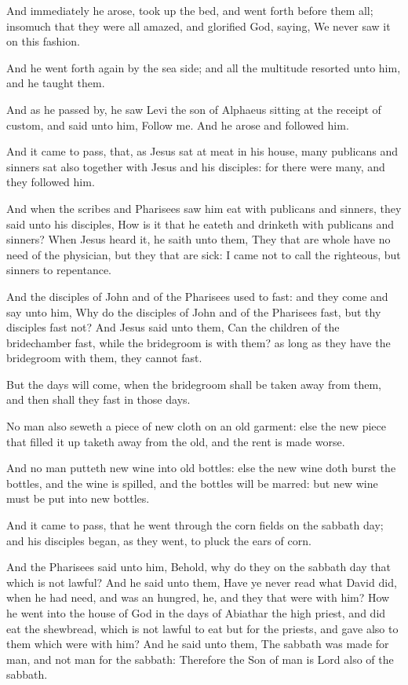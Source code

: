 \Verse And immediately he arose, took up the bed, and went forth before them all; insomuch that they were all amazed, and glorified God, saying, We never saw it on this fashion.

\Verse And he went forth again by the sea side; and all the multitude resorted unto him, and he taught them.

\Verse And as he passed by, he saw Levi the son of Alphaeus sitting at the receipt of custom, and said unto him, Follow me. And he arose and followed him.

\Verse And it came to pass, that, as Jesus sat at meat in his house, many publicans and sinners sat also together with Jesus and his disciples: for there were many, and they followed him.

\Verse And when the scribes and Pharisees saw him eat with publicans and sinners, they said unto his disciples, How is it that he eateth and drinketh with publicans and sinners?  \Verse When Jesus heard it, he saith unto them, They that are whole have no need of the physician, but they that are sick: I came not to call the righteous, but sinners to repentance.

\Verse And the disciples of John and of the Pharisees used to fast: and they come and say unto him, Why do the disciples of John and of the Pharisees fast, but thy disciples fast not?  \Verse And Jesus said unto them, Can the children of the bridechamber fast, while the bridegroom is with them? as long as they have the bridegroom with them, they cannot fast.

\Verse But the days will come, when the bridegroom shall be taken away from them, and then shall they fast in those days.

\Verse No man also seweth a piece of new cloth on an old garment: else the new piece that filled it up taketh away from the old, and the rent is made worse.

\Verse And no man putteth new wine into old bottles: else the new wine doth burst the bottles, and the wine is spilled, and the bottles will be marred: but new wine must be put into new bottles.

\Verse And it came to pass, that he went through the corn fields on the sabbath day; and his disciples began, as they went, to pluck the ears of corn.

\Verse And the Pharisees said unto him, Behold, why do they on the sabbath day that which is not lawful?  \Verse And he said unto them, Have ye never read what David did, when he had need, and was an hungred, he, and they that were with him?  \Verse How he went into the house of God in the days of Abiathar the high priest, and did eat the shewbread, which is not lawful to eat but for the priests, and gave also to them which were with him?  \Verse And he said unto them, The sabbath was made for man, and not man for the sabbath: \Verse Therefore the Son of man is Lord also of the sabbath.



